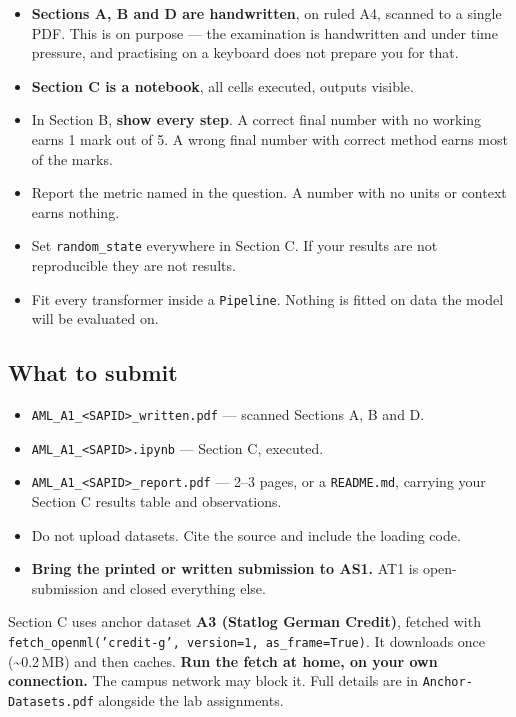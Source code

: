 \documentclass[11pt,a4paper]{article}
\begin{document}
\begin{itemize}[leftmargin=*]
  \item \textbf{Sections A, B and D are handwritten}, on ruled A4, scanned to a
    single PDF. This is on purpose --- the examination is handwritten and under
    time pressure, and practising on a keyboard does not prepare you for that.
  \item \textbf{Section C is a notebook}, all cells executed, outputs visible.
  \item In Section B, \textbf{show every step}. A correct final number with no
    working earns 1 mark out of 5. A wrong final number with correct method
    earns most of the marks.
  \item Report the metric named in the question. A number with no units or
    context earns nothing.
  \item Set \texttt{random\_state} everywhere in Section C. If your results are
    not reproducible they are not results.
  \item Fit every transformer inside a \texttt{Pipeline}. Nothing is fitted on
    data the model will be evaluated on.
\end{itemize}

\subsection*{What to submit}

\begin{itemize}[leftmargin=*]
  \item \texttt{AML\_A1\_<SAPID>\_written.pdf} --- scanned Sections A, B and D.
  \item \texttt{AML\_A1\_<SAPID>.ipynb} --- Section C, executed.
  \item \texttt{AML\_A1\_<SAPID>\_report.pdf} --- 2--3 pages, or a
    \texttt{README.md}, carrying your Section C results table and observations.
  \item Do not upload datasets. Cite the source and include the loading code.
  \item \textbf{Bring the printed or written submission to AS1.} AT1 is
    open-submission and closed everything else.
\end{itemize}

\begin{warnbox}
Section C uses anchor dataset \textbf{A3 (Statlog German Credit)}, fetched with
\texttt{fetch\_openml('credit-g', version=1, as\_frame=True)}. It downloads
once (\textasciitilde0.2\,MB) and then caches. \textbf{Run the fetch at home,
on your own connection.} The campus network may block it. Full details are in
\texttt{Anchor-Datasets.pdf} alongside the lab assignments.
\end{warnbox}
\end{document}

